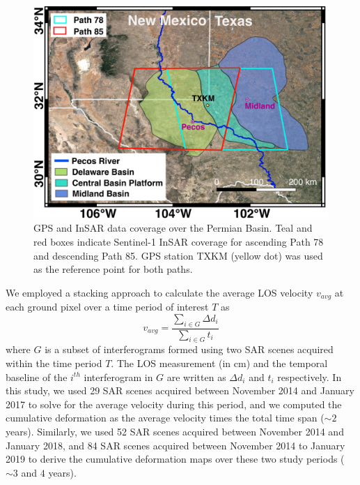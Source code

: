 \begin{figure}
	\centering
	\includegraphics[width=0.96\linewidth]{paper2/figures/figure4-study-area.png}
	\caption[GPS and InSAR data coverage over the Permian Basin]{GPS and InSAR data coverage over the Permian Basin. Teal and red boxes indicate Sentinel-1 InSAR coverage for ascending Path 78 and descending Path 85. GPS station TXKM (yellow dot) was used as the reference point for both paths.
	}
	\label{fig:study-area}
\end{figure}


We employed a stacking approach \citep{Sandwell1998PhaseGradientApproach, Staniewicz2020InsarRevealsComplex} to calculate the average LOS velocity $v_{avg}$ at each ground pixel over a time period of interest $ T $ as
\begin{equation}
	v_{avg} = \frac{\sum_{i \in G} \Delta  d_i}{\sum_{i \in G} t_i}
	\label{eq:stacking-paper2}
\end{equation}
where $G$ is a subset of interferograms formed using two SAR scenes acquired within the time period $T$. The LOS measurement (in cm) and the temporal baseline of the $i^{th}$ interferogram in $G$ are written as $\Delta d_i$ and $ t_i $ respectively.
In this study, we used 29 SAR scenes acquired between November 2014 and January 2017 to solve for the average velocity during this period, and we computed the cumulative deformation as the average velocity times the total time span ($\sim 2$ years). Similarly, we used 52 SAR scenes acquired between November 2014 and January 2018, and 84 SAR scenes acquired between November 2014 to January 2019 to derive the cumulative deformation maps over these two study periods ($\sim 3$ and $4$ years).

